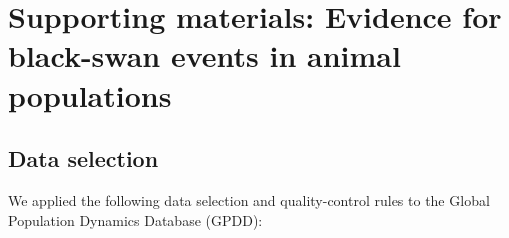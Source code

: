 \section{Supporting materials: Evidence for black-swan events in animal populations}

\begin{centering}
\LARGE
\end{centering}

\subsection{Data selection}

We applied the following data selection and quality-control rules to the
Global Population Dynamics Database (GPDD):

